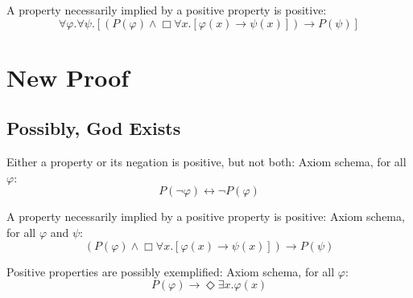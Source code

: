 \documentclass{llncs}
\newcommand{\imp}{\rightarrow}
\newcommand{\biimp}{\leftrightarrow}
\newcommand{\all}{\forall}
\newcommand{\ex}{\exists}
\newcommand{\nec}{\Box} %
\newcommand{\pos}{\Diamond} %
\begin{document}
\begin{axiom}
\label{A2}
A property necessarily implied by a positive property is positive:
$$
\all \varphi. \all \psi.[(P(\varphi) \wedge \nec \all x.[\varphi(x) \imp \psi(x)]) \imp P(\psi)]
$$
\end{axiom}

\section{New Proof}
\setcounter{axiom}{0}
\setcounter{lemma}{0}
\setcounter{theorem}{0}
\setcounter{corollary}{0}
\subsection{Possibly, God Exists}
\begin{axiom}
\label{A1}
Either a property or its negation is positive, but not both:
Axiom schema, for all $\varphi$:
$$
P(\neg \varphi) \biimp \neg P(\varphi)
$$
\end{axiom}
\begin{axiom}
\label{A2}
A property necessarily implied by a positive property is positive:
Axiom schema, for all $\varphi$ and $\psi$: 
$$
(P(\varphi) \wedge \nec \all x.[\varphi(x) \imp \psi(x)]) \imp P(\psi)
$$
\end{axiom}
\begin{theorem}
\label{T1}
Positive properties are possibly exemplified:
Axiom schema, for all $\varphi$:
$$
P(\varphi) \imp \pos \ex x.\varphi(x)
$$
\end{theorem}
\end{document}
